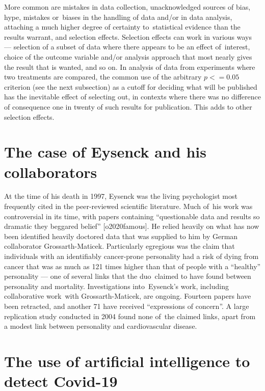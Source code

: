 \documentclass[
  10pt,
  b5paper]{book}
\begin{document}
More common are mistakes in data collection, unacknowledged
sources of bias, hype, mistakes or~biases in the handling of
data and/or in data analysis, attaching a much higher
degree of certainty to~statistical evidence than the results
warrant, and selection effects. Selection effects can work
in various ways --- selection of a subset of data where
there appears to be an effect of~interest, choice of the
outcome variable and/or analysis approach that most nearly
gives the result that is wanted, and so on. In analysis of
data from experiments where two treatments are compared,
the common use of the arbitrary \(p <= 0.05\) criterion
(see the next subsection) as a cutoff for deciding what
will be published has the inevitable effect of selecting out,
in contexts where there was no difference of consequence
one in twenty of such results for publication. This adds
to other selection effects.

\hypertarget{the-case-of-eysenck-and-his-collaborators}{%
\section{The case of Eysenck and his collaborators}\label{the-case-of-eysenck-and-his-collaborators}}

At the time of his death in 1997, Eysenck was the living psychologist
most frequently cited in the peer-reviewed scientific literature.
Much of~his work was controversial in its time, with papers
containing ``questionable data and results so dramatic they beggared
belief'' {[}o2020famous{]}. He relied heavily on what has now been
identified heavily doctored data that was supplied to him by
German collaborator Grossarth-Maticek. Particularly egregious was
the claim that individuals with an identifiably cancer-prone personality
had a risk of dying from cancer that was as much as 121 times higher
than that of people with a ``healthy'' personality --- one of several
links that the duo~claimed to have found between personality and
mortality. Investigations into~Eysenck's work, including
collaborative work~with Grossarth-Maticek, are ongoing. Fourteen
papers have been retracted, and another 71 have received
``expressions of concern''. A large replication study conducted in
2004 found none of~the claimed links, apart from a modest link between
personality and cardiovascular disease.

\hypertarget{the-use-of-artificial-intelligence-to-detect-covid-19}{%
\section{The use of artificial intelligence to detect Covid-19}\label{the-use-of-artificial-intelligence-to-detect-covid-19}}
\end{document}
